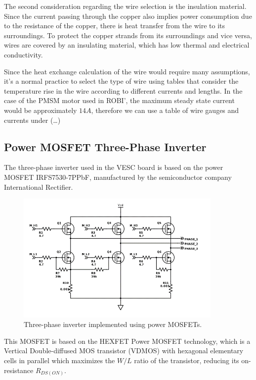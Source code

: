 
The second consideration regarding the wire selection is the insulation material. Since the current passing through the copper also implies power consumption due to the resistance of the copper, there is heat transfer from the wire to its surroundings. To protect the copper strands from its surroundings and vice versa, wires are covered by an insulating material, which has low thermal and electrical conductivity.

Since the heat exchange calculation of the wire would require many assumptions, it’s a normal practice to select the type of wire using tables that consider the temperature rise in the wire according to different currents and lengths. In the case of the \ac{PMSM} motor used in ROBI', the maximum steady state current would be approximately $14A$, therefore we can use a table of wire gauges and currents under (…) 



\subsection{Power MOSFET Three-Phase Inverter}
The three-phase inverter used in the VESC board is based on the power \ac{MOSFET} IRFS7530-7PPbF, manufactured by the semiconductor company International Rectifier.

\begin{figure}[htbp]
\centering
\includegraphics[width=10cm]{Images/inverter_3.png} 
\caption[VESC Board Inverter]{Three-phase inverter implemented using power MOSFETs.}
\label{fig:inverter_3}
\end{figure}

This \ac{MOSFET} is based on the HEXFET Power \ac{MOSFET} technology, which is a Vertical Double-diffused MOS transistor (VDMOS) with hexagonal elementary cells in parallel which maximizes the $W/L$ ratio of the transistor, reducing its on-resistance $R_{DS(ON)}$. 

